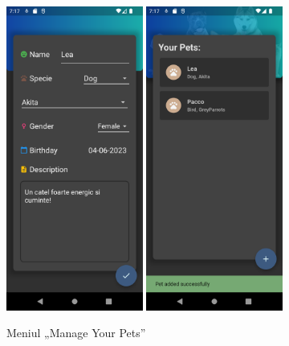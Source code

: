 \begin{figure}[ht]
    \centering
    \includegraphics[width=0.4\textwidth]{images/screenshots/create_pet.png}
    \includegraphics[width=0.4\textwidth]{images/screenshots/your_pets.png}

    \caption{Meniul „Manage Your Pets”}
    \label{fig:manage_your_pets}
\end{figure}

